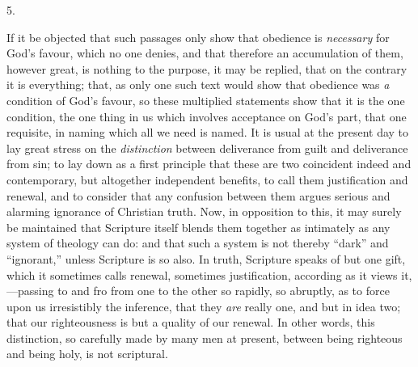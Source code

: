 5.

If it be objected that such passages only show that obedience is \emph{necessary}
for God's favour, which no one denies, and that therefore an
accumulation of them, however great, is nothing to the purpose, it may
be replied, that on the contrary it is everything; that, as only one
such text would show that obedience was \emph{a} condition of God's favour,
so these multiplied statements show that it is the one condition, the
one thing in us which involves acceptance on God's part, that one
requisite, in naming which all we need is named. It is usual at the
present day to lay great stress on the \emph{distinction} between
deliverance from guilt and deliverance from sin; to lay down as a
first principle that these are two coincident indeed and contemporary,
but altogether independent benefits, to call them justification and
renewal, and to consider that any confusion between them argues
serious and alarming ignorance of Christian truth. Now, in opposition
to this, it may surely be maintained that Scripture itself blends them
together as intimately as any system of theology can do: and that such a system is not thereby ``dark'' and
``ignorant,'' unless Scripture is so also. In truth, Scripture
speaks of but one gift, which it sometimes calls renewal, sometimes
justification, according as it views it,—passing to and fro from one
to the other so rapidly, so abruptly, as to force upon us irresistibly
the inference, that they \emph{are} really one, and but in idea two;
that our righteousness is but a quality of our renewal. In other
words, this distinction, so carefully made by many men at present,
between being righteous and being holy, is not scriptural.

